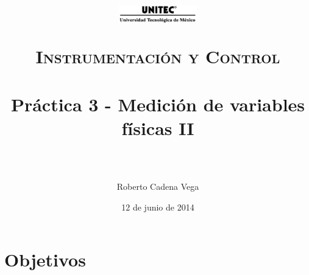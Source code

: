 



\title{	
	\normalfont \normalsize
	\begin{figure}[h]
		\begin{center}
			\includegraphics[width=0.3\textwidth]{../images/UNITEC.png} %
		\end{center}
	\end{figure}
	\textsc{Instrumentación y Control} \\ [25pt]
	\horrule{0.5pt} \\[0.4cm] %
	\huge Práctica 3 - Medición de variables físicas II \\ %
	\horrule{2pt} \\[0.5cm] %
}

\author{Roberto Cadena Vega} %

\date{\normalsize 12 de junio de 2014} %




\maketitle %


\section{Objetivos}

